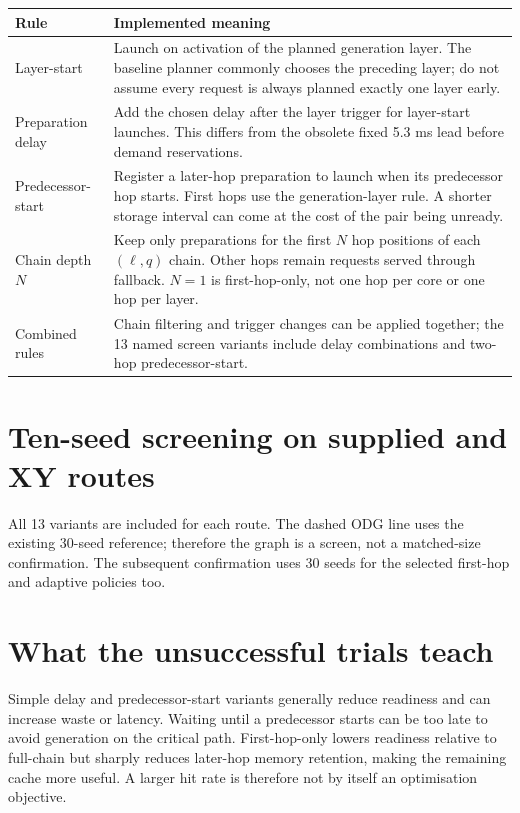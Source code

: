 \documentclass[11pt,a4paper,oneside]{report}
\begin{document}
\begin{longtable}{p{.31\linewidth}p{.61\linewidth}}
\toprule Rule & Implemented meaning\\\midrule\endhead
Layer-start & Launch on activation of the planned generation layer. The baseline planner commonly chooses the preceding layer; do not assume every request is always planned exactly one layer early.\\
Preparation delay & Add the chosen delay after the layer trigger for layer-start launches. This differs from the obsolete fixed 5.3 ms lead before demand reservations.\\
Predecessor-start & Register a later-hop preparation to launch when its predecessor hop starts. First hops use the generation-layer rule. A shorter storage interval can come at the cost of the pair being unready.\\
Chain depth $N$ & Keep only preparations for the first $N$ hop positions of each $(\ell,q)$ chain. Other hops remain requests served through fallback. $N=1$ is first-hop-only, not one hop per core or one hop per layer.\\
Combined rules & Chain filtering and trigger changes can be applied together; the 13 named screen variants include delay combinations and two-hop predecessor-start.\\
\bottomrule
\end{longtable}

\section{Ten-seed screening on supplied and XY routes}
All 13 variants are included for each route. The dashed ODG line uses the existing 30-seed reference; therefore the graph is a screen, not a matched-size confirmation. The subsequent confirmation uses 30 seeds for the selected first-hop and adaptive policies too.


\section{What the unsuccessful trials teach}
Simple delay and predecessor-start variants generally reduce readiness and can increase waste or latency. Waiting until a predecessor starts can be too late to avoid generation on the critical path. First-hop-only lowers readiness relative to full-chain but sharply reduces later-hop memory retention, making the remaining cache more useful. A larger hit rate is therefore not by itself an optimisation objective.
\end{document}
